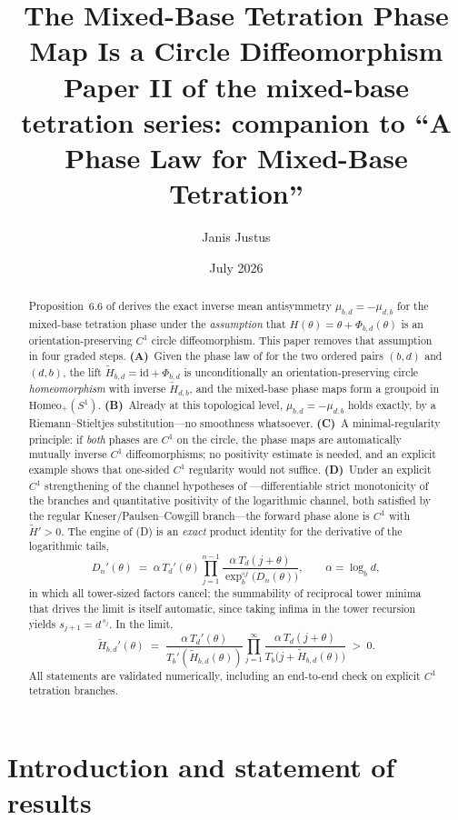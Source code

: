 \documentclass[11pt]{article}
\title{The Mixed-Base Tetration Phase Map Is a Circle Diffeomorphism\\[2mm]
\large Paper II of the mixed-base tetration series: companion to ``A Phase Law for Mixed-Base Tetration'' \cite{J}}
\author{Janis Justus}
\date{July 2026}
\theoremstyle{definition}
\theoremstyle{remark}
\newcommand{\Sone}{S^{1}}
\newcommand{\Tb}{T_{b}}
\newcommand{\Td}{T_{d}}
\newcommand{\expb}{\exp_{b}}
\newcommand{\Ht}{\widetilde H}
\begin{document}
\maketitle

\begin{abstract}
Proposition~6.6 of \cite{J} derives the exact inverse mean antisymmetry
$\mu_{b,d}=-\mu_{d,b}$ for the mixed-base tetration phase under the
\emph{assumption} that $H(\theta)=\theta+\Phi_{b,d}(\theta)$ is an
orientation-preserving $C^{1}$ circle diffeomorphism. This paper removes
that assumption in four graded steps. \textbf{(A)}~Given the phase law of
\cite{J} for the two ordered pairs $(b,d)$ and $(d,b)$, the lift
$\Ht_{b,d}=\mathrm{id}+\Phi_{b,d}$ is unconditionally an
orientation-preserving circle \emph{homeomorphism} with inverse
$\Ht_{d,b}$, and the mixed-base phase maps form a groupoid in
$\mathrm{Homeo}_{+}(\Sone)$. \textbf{(B)}~Already at this topological
level, $\mu_{b,d}=-\mu_{d,b}$ holds exactly, by a Riemann--Stieltjes
substitution---no smoothness whatsoever. \textbf{(C)}~A minimal-regularity
principle: if \emph{both} phases are $C^{1}$ on the circle, the phase
maps are automatically mutually inverse $C^{1}$ diffeomorphisms; no
positivity estimate is needed, and an explicit example shows that
one-sided $C^{1}$ regularity would not suffice. \textbf{(D)}~Under an
explicit $C^{1}$ strengthening of the channel hypotheses of
\cite{J}---differentiable strict monotonicity of the branches and
quantitative positivity of the logarithmic channel, both satisfied by the
regular Kneser/Paulsen--Cowgill branch---the forward phase alone is
$C^{1}$ with $\Ht'>0$. The engine of (D) is an \emph{exact} product
identity for the derivative of the logarithmic tails,
\[
D_n'(\theta)\;=\;\alpha\,\Td'(\theta)\prod_{j=1}^{n-1}
\frac{\alpha\,\Td(j+\theta)}{\expb^{\circ j}\!\big(D_n(\theta)\big)},
\qquad \alpha=\log_b d,
\]
in which all tower-sized factors cancel; the summability of reciprocal
tower minima that drives the limit is itself automatic, since taking
infima in the tower recursion yields $s_{j+1}=d^{\,s_j}$. In the limit,
\[
\Ht_{b,d}'(\theta)\;=\;\frac{\alpha\,\Td'(\theta)}{\Tb'(\Ht_{b,d}(\theta))}
\prod_{j=1}^{\infty}\frac{\alpha\,\Td(j+\theta)}{\Tb\!\big(j+\Ht_{b,d}(\theta)\big)}\;>\;0 .
\]
All statements are validated numerically, including an end-to-end check
on explicit $C^{1}$ tetration branches.
\end{abstract}

\section{Introduction and statement of results}\label{sec:intro}
\end{document}
